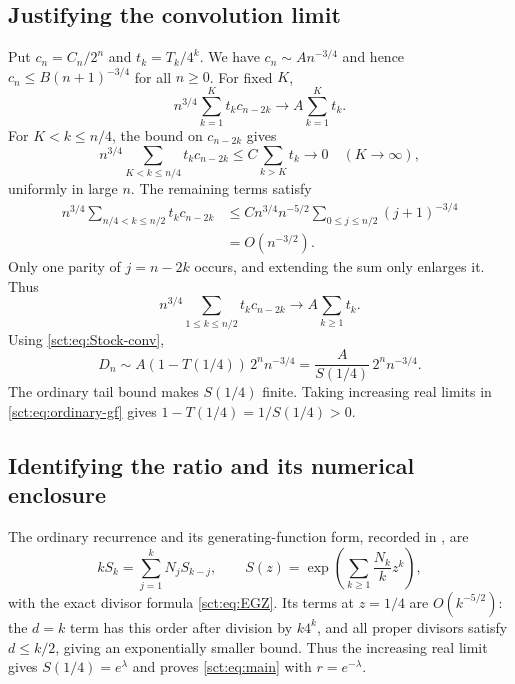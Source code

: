 \documentclass[11pt,letterpaper]{article}
\theoremstyle{definition}\newtheorem{remark}[theorem]{Remark}
\begin{document}
\subsection{Justifying the convolution limit}
Put $c_n=C_n/2^n$ and $t_k=T_k/4^k$. We have
$c_n\sim A n^{-3/4}$ and hence $c_n\le B(n+1)^{-3/4}$ for all $n\ge0$.
For fixed $K$,
\[
 n^{3/4}\sum_{k=1}^K t_k c_{n-2k}
 \longrightarrow A\sum_{k=1}^K t_k.
\]
For $K<k\le n/4$, the bound on $c_{n-2k}$ gives
\begin{equation}\label{sct:eq:conv-tail-one}
 n^{3/4}\sum_{K<k\le n/4}t_k c_{n-2k}
 \le C\sum_{k>K}t_k\longrightarrow0\quad(K\to\infty),
\end{equation}
uniformly in large $n$. The remaining terms satisfy
\begin{align}
 n^{3/4}\sum_{n/4<k\le n/2}t_k c_{n-2k}
 &\le C n^{3/4}n^{-5/2}
       \sum_{0\le j\le n/2}(j+1)^{-3/4}\nonumber\\
 &=O(n^{-3/2}).\label{sct:eq:conv-tail-two}
\end{align}
Only one parity of $j=n-2k$ occurs, and extending the sum only enlarges it.
Thus
\begin{equation}\label{sct:eq:conv-limit}
 n^{3/4}\sum_{1\le k\le n/2}t_k c_{n-2k}
 \longrightarrow A\sum_{k\ge1}t_k.
\end{equation}
Using \eqref{sct:eq:Stock-conv},
\begin{equation}\label{sct:eq:D-amplitude}
 D_n\sim A(1-T(1/4))\,2^n n^{-3/4}
       =\frac{A}{S(1/4)}\,2^n n^{-3/4}.
\end{equation}
The ordinary tail bound makes $S(1/4)$ finite. Taking increasing real limits
in \eqref{sct:eq:ordinary-gf} gives $1-T(1/4)=1/S(1/4)>0$.

\subsection{Identifying the ratio and its numerical enclosure}
The ordinary recurrence and its generating-function form, recorded in
\cite{kolesnik,bdk}, are
\begin{equation}\label{sct:eq:ordinary-recurrence}
 kS_k=\sum_{j=1}^kN_jS_{k-j},\qquad
 S(z)=\exp\left(\sum_{k\ge1}\frac{N_k}{k}z^k\right),
\end{equation}
with the exact divisor formula \eqref{sct:eq:EGZ}. Its terms at $z=1/4$ are
$O(k^{-5/2})$: the $d=k$ term has this order after division by $k4^k$,
and all proper divisors satisfy $d\le k/2$, giving an exponentially smaller
bound. Thus the increasing real limit gives $S(1/4)=e^\lambda$ and proves
\eqref{sct:eq:main} with $r=e^{-\lambda}$.
\end{document}
